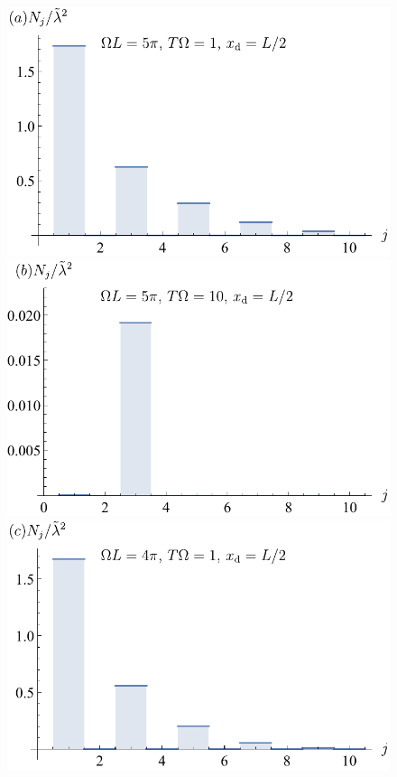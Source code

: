 \documentclass[prd,twocolumn,superscriptaddress,nofootinbib,floatfix,amsmath,amssymb]{revtex4-2}
\begin{document}
    \begin{figure}[tp]
        \includegraphics[scale=0.5]{Fig8a.pdf}
        \includegraphics[scale=0.5]{Fig8b.pdf}
        \includegraphics[scale=0.5]{Fig8c.pdf}

\end{figure}
\end{document}
